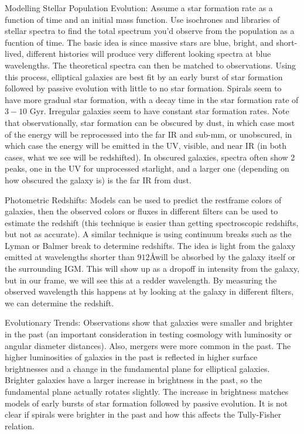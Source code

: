Modelling Stellar Population Evolution:\newline
Assume a star formation rate as a function of time and an initial mass 
function.  Use isochrones and libraries of stellar spectra to find the 
total spectrum you'd observe from the population as a fucntion of time.  
The basic idea is since massive stars are blue, bright, and short-lived, 
different histories will produce very different looking spectra at blue 
wavelengths.  The theoretical spectra can then be matched to observations.  
Using this process, elliptical galaxies are best fit by an early burst 
of star formation followed by passive evolution with little to no star 
formation.  Spirals seem to have more gradual star formation, with a decay 
time in the star formation rate of $3-10$ Gyr.  Irregular galaxies seem to 
have constant star formation rates.  Note that observationally, star formation 
can be obscured by dust, in which case most of the energy will be reprocessed 
into the far IR and sub-mm, or unobscured, in which case the energy will be 
emitted in the UV, visible, and near IR (in both cases, what we see will be 
redshifted).  In obscured galaxies, spectra often show 2 peaks, one in the 
UV for unprocessed starlight, and a larger one (depending on how obscured the 
galaxy is) is the far IR from dust.  

Photometric Redshifts:\newline
Models can be used to predict the restframe colors of galaxies, then the 
observed colors or fluxes in different filters can be used to estimate the 
redshift (this technique is 
easier than getting spectroscopic redshifts, but not as accurate).  A similar 
technique is using continuum breaks such as the Lyman or Balmer break to 
determine redshifts.  The idea is light from the galaxy emitted at wavelengths 
shorter than $912$\AA will be absorbed by the galaxy itself or the surrounding 
IGM.  This will show up as a dropoff in intensity from the galaxy, but in our 
frame, we will see this at a redder wavelength.  By measuring the observed 
wavelength this happens at by looking at the galaxy in different filters, we 
can determine the redshift.  

Evolutionary Trends:\newline
Observations show that galaxies were smaller and brighter in the past 
(an important consideration in testing cosmology with luminosity or angular 
diameter distances).  Also, mergers were more common in the past.  The 
higher luminosities of galaxies in the past is reflected in higher surface 
brightnesses and a change in the fundamental plane for elliptical galaxies.  
Brighter galaxies have a larger increase in brightness in the past, so 
the fundamental plane actually rotates slightly.  The increase in brightness 
matches models of early bursts of star formation followed by passive 
evolution.  It is not clear if spirals were brighter in the past and how 
this affects the Tully-Fisher relation.  

